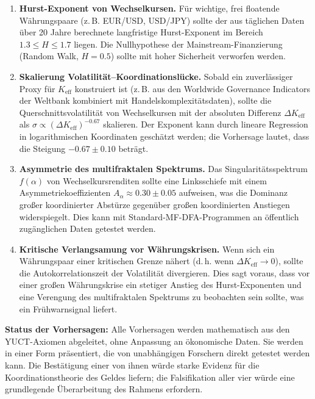 \documentclass[12pt,a4paper]{article}
\theoremstyle{remark}
\begin{document}
	\begin{enumerate}[label=(\arabic*)]
		\item \textbf{Hurst-Exponent von Wechselkursen.} Für wichtige, frei floatende Währungspaare (z. B. EUR/USD, USD/JPY) sollte der aus täglichen Daten über 20 Jahre berechnete langfristige Hurst-Exponent im Bereich \(1.3 \le H \le 1.7\) liegen. Die Nullhypothese der Mainstream-Finanzierung (Random Walk, \(H = 0.5\)) sollte mit hoher Sicherheit verworfen werden.
		
		\item \textbf{Skalierung Volatilität–Koordinationslücke.} Sobald ein zuverlässiger Proxy für \(K_{\mathrm{eff}}\) konstruiert ist (z. B. aus den Worldwide Governance Indicators der Weltbank kombiniert mit Handelskomplexitätsdaten), sollte die Querschnittsvolatilität von Wechselkursen mit der absoluten Differenz \(\Delta K_{\mathrm{eff}}\) als \(\sigma \propto (\Delta K_{\mathrm{eff}})^{-0.67}\) skalieren. Der Exponent kann durch lineare Regression in logarithmischen Koordinaten geschätzt werden; die Vorhersage lautet, dass die Steigung \(-0.67 \pm 0.10\) beträgt.
		
		\item \textbf{Asymmetrie des multifraktalen Spektrums.} Das Singularitätsspektrum \(f(\alpha)\) von Wechselkursrenditen sollte eine Linksschiefe mit einem Asymmetriekoeffizienten \(A_\alpha \approx 0.30 \pm 0.05\) aufweisen, was die Dominanz großer koordinierter Abstürze gegenüber großen koordinierten Anstiegen widerspiegelt. Dies kann mit Standard-MF-DFA-Programmen an öffentlich zugänglichen Daten getestet werden.
		
		\item \textbf{Kritische Verlangsamung vor Währungskrisen.} Wenn sich ein Währungspaar einer kritischen Grenze nähert (d. h. wenn \(\Delta K_{\mathrm{eff}} \to 0\)), sollte die Autokorrelationszeit der Volatilität divergieren. Dies sagt voraus, dass vor einer großen Währungskrise ein stetiger Anstieg des Hurst-Exponenten und eine Verengung des multifraktalen Spektrums zu beobachten sein sollte, was ein Frühwarnsignal liefert.
	\end{enumerate}
	
	\textbf{Status der Vorhersagen:} Alle Vorhersagen werden mathematisch aus den YUCT-Axiomen abgeleitet, ohne Anpassung an ökonomische Daten. Sie werden in einer Form präsentiert, die von unabhängigen Forschern direkt getestet werden kann. Die Bestätigung einer von ihnen würde starke Evidenz für die Koordinationstheorie des Geldes liefern; die Falsifikation aller vier würde eine grundlegende Überarbeitung des Rahmens erfordern.
	
\end{document}
